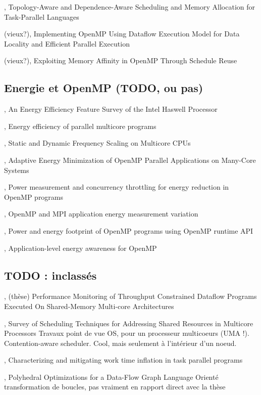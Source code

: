 \cite{Drebes2014}, Topology-Aware and Dependence-Aware Scheduling and Memory Allocation for Task-Parallel Languages





(vieux?)\cite{Weng2002}, Implementing OpenMP Using Dataflow Execution Model for Data Locality and Efficient Parallel Execution

(vieux?)\cite{Nikolopoulos2001}, Exploiting Memory Affinity in OpenMP Through Schedule Reuse



\subsection{Energie et OpenMP (TODO, ou pas)}


\cite{Hackenberg2015}, An Energy Efficiency Feature Survey of the Intel Haswell Processor

\cite{Davidovic2015}, Energy efficiency of parallel multicore programs

\cite{Bao2016}, Static and Dynamic Frequency Scaling on Multicore CPUs

\cite{Shafik2015}, Adaptive Energy Minimization of OpenMP Parallel Applications on Many-Core Systems

\cite{Porterfield2013}, Power measurement and concurrency throttling for energy reduction in OpenMP programs

\cite{Porterfield2013a}, OpenMP and MPI application energy measurement variation

\cite{Nandamuri2015}, Power and energy footprint of OpenMP programs using OpenMP runtime API

\cite{Alessi2015}, Application-level energy awareness for OpenMP


\subsection{TODO : inclassés}

\cite{Selva2015}, (thèse) Performance Monitoring of Throughput Constrained Dataflow Programs Executed On Shared-Memory Multi-core Architectures

\cite{Zhuravlev2012}, Survey of Scheduling Techniques for Addressing Shared Resources in Multicore Processors
Travaux point de vue OS, pour un processeur multicoeurs (UMA !).
Contention-aware scheduler.
Cool, mais seulement à l'intérieur d'un noeud.

\cite{Olivier2013}, Characterizing and mitigating work time inflation in task parallel programs


\cite{Sbirlea2015}, Polyhedral Optimizations for a Data-Flow Graph Language
Orienté transformation de boucles, pas vraiment en rapport direct avec la thèse

